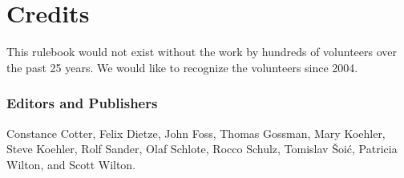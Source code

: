 \renewcommand\thepart{} %
\renewcommand\partname{} %
\part{Credits}
This rulebook would not exist without the work by hundreds of volunteers over the past 25 years.
We would like to recognize the volunteers since 2004.

\vspace{-2pt}
\section*{Editors and Publishers}
\vspace{-2pt}
\begingroup
\fontsize{10pt}{10pt}\selectfont
Constance Cotter,
Felix Dietze,
John Foss,
Thomas Gossman,
Mary  Koehler,
Steve Koehler,
Rolf Sander,
Olaf Schlote,
Rocco Schulz,
Tomislav Šoić,
Patricia Wilton,
and Scott Wilton.
\endgroup

\vspace{-2pt}
